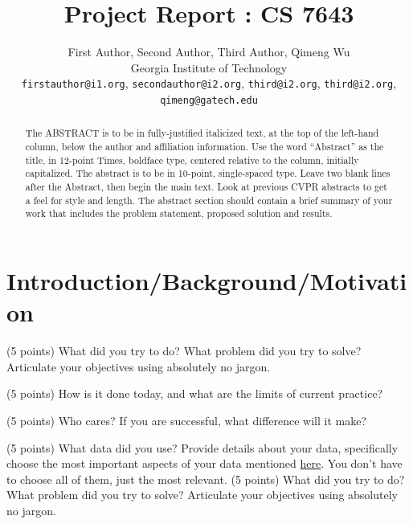 \documentclass[10pt,twocolumn,letterpaper]{article}
\begin{document}
\title{Project Report : CS 7643}

\author{First Author, Second Author, Third Author, Qimeng Wu\\
Georgia Institute of Technology\\
{\tt\small firstauthor@i1.org}, {\tt\small secondauthor@i2.org}, {\tt\small third@i2.org}, {\tt\small third@i2.org}, {\tt\small  qimeng@gatech.edu}
}
\maketitle

\begin{abstract}
   The ABSTRACT is to be in fully-justified italicized text, at the top
   of the left-hand column, below the author and affiliation
   information. Use the word ``Abstract'' as the title, in 12-point
   Times, boldface type, centered relative to the column, initially
   capitalized. The abstract is to be in 10-point, single-spaced type.
   Leave two blank lines after the Abstract, then begin the main text.
   Look at previous CVPR abstracts to get a feel for style and length. 
   The abstract section should contain a brief summary of your work that
   includes the problem statement, proposed solution and results.
\end{abstract}

\section{Introduction/Background/Motivation}

(5 points) What did you try to do? What problem did you try to solve? Articulate your objectives using absolutely no jargon. 

(5 points) How is it done today, and what are the limits of current practice?

(5 points) Who cares? If you are successful, what difference will it make? 

(5 points) What data did you use? Provide details about your data, specifically choose the most important aspects of your data mentioned \href{https://arxiv.org/abs/1803.09010}{here}. You don’t have to choose all of them, just the most relevant.
(5 points) What did you try to do? What problem did you try to solve? Articulate your objectives using absolutely no jargon. 
\end{document}
